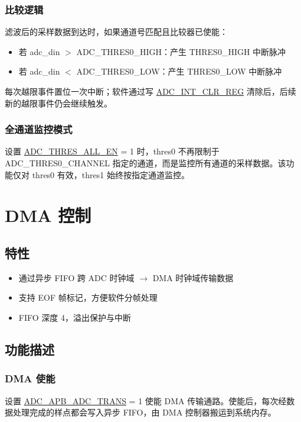 \documentclass[main\_\_CN.tex]{subfiles}
\begin{document}
\subsubsection{比较逻辑}
滤波后的采样数据到达时，如果通道号匹配且比较器已使能：
\begin{itemize}
    \item 若 adc\_din $>$ ADC\_THRES0\_HIGH：产生 THRES0\_HIGH 中断脉冲
    \item 若 adc\_din $<$ ADC\_THRES0\_LOW：产生 THRES0\_LOW 中断脉冲
\end{itemize}
每次越限事件置位一次中断；软件通过写 \hyperref[regdesc:ADCINTCLRREG]{ADC\_INT\_CLR\_REG} 清除后，后续新的越限事件仍会继续触发。

\subsubsection{全通道监控模式}
设置 \hyperref[fielddesc:ADCTHRESALLEN]{ADC\_THRES\_ALL\_EN} = 1 时，thres0 不再限制于 ADC\_THRES0\_CHANNEL 指定的通道，而是监控所有通道的采样数据。该功能仅对 thres0 有效，thres1 始终按指定通道监控。


\section{DMA 控制}
\label{sec:adc-dma}

\subsection{特性}
\begin{itemize}
    \item 通过异步 FIFO 跨 ADC 时钟域 $\to$ DMA 时钟域传输数据
    \item 支持 EOF 帧标记，方便软件分帧处理
    \item FIFO 深度 4，溢出保护与中断
\end{itemize}

\subsection{功能描述}
\label{sec:adc-dma-func-descr}

\subsubsection{DMA 使能}
设置 \hyperref[fielddesc:ADCAPBADCTRANS]{ADC\_APB\_ADC\_TRANS} = 1 使能 DMA 传输通路。使能后，每次经数据处理完成的样点都会写入异步 FIFO，由 DMA 控制器搬运到系统内存。
\end{document}
